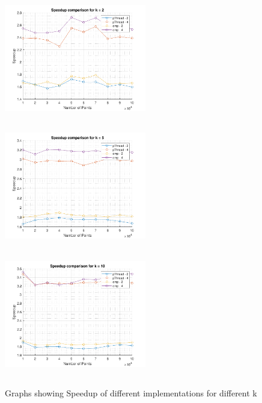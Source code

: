 \documentclass[a4paper, 11pt, margin=1in]{article}
\begin{document}
\begin{figure}[H]
    \centering
    \includegraphics[width=6.2cm,height=5.5cm]{sk2}
    \includegraphics[width=6.2cm,height=5.5cm]{sk5}
    \includegraphics[width=6.2cm,height=5.5cm]{sk10}
    \caption{Graphs showing Speedup of different implementations for different k}
    \label{fig:speedup}
\end{figure}
\end{document}
